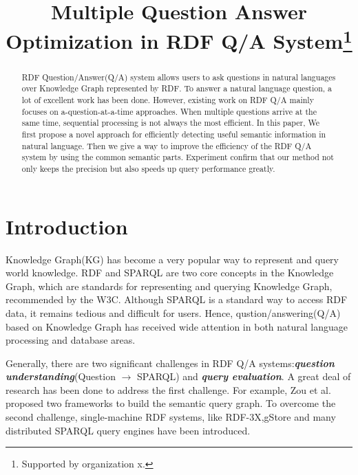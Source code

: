 \documentclass[runningheads]{llncs}
\begin{document}
%
\title{Multiple Question Answer Optimization in RDF Q/A System\thanks{Supported by organization x.}}
\author{}
\institute{}
%
%
%
\maketitle              %
%
\begin{abstract}
RDF Question/Answer(Q/A) system allows users to ask questions in natural languages over Knowledge Graph represented by RDF. To answer a natural language question, a lot of excellent work has been done. However, existing work on RDF Q/A mainly focuses on a-question-at-a-time approaches. When multiple questions arrive at the same time, sequential processing is not always the most efficient. In this paper, We first propose a novel approach for efficiently detecting useful semantic information in natural language. Then we give a way to improve the efficiency of the RDF Q/A system by using the common semantic parts. Experiment confirm that our method not only keeps the precision but also speeds up query performance greatly.
\end{abstract}
%
%
%
\section{Introduction}

Knowledge Graph(KG) has become a very popular way to represent and query world knowledge. RDF and SPARQL are two core concepts in the Knowledge Graph, which are standards for representing and querying Knowledge Graph, recommended by the W3C. Although SPARQL is a standard way to access RDF data, it remains tedious and difficult for users. Hence, qustion/answering(Q/A) based on Knowledge Graph has received wide attention in both natural language processing and database areas.

Generally, there are two significant challenges in RDF Q/A systems:\textit{\textbf{question understanding}}(Question $\rightarrow$ SPARQL) and \textit{\textbf{query evaluation}}. A great deal of research has been done to address the first challenge. For example, Zou et al\cite{gAnswer}. proposed two frameworks to build the semantic query graph. To overcome the second challenge, single-machine RDF systems, like RDF-3X\cite{RDF3X},gStore\cite{gStore} and many distributed SPARQL query engines have been introduced.
\end{document}
